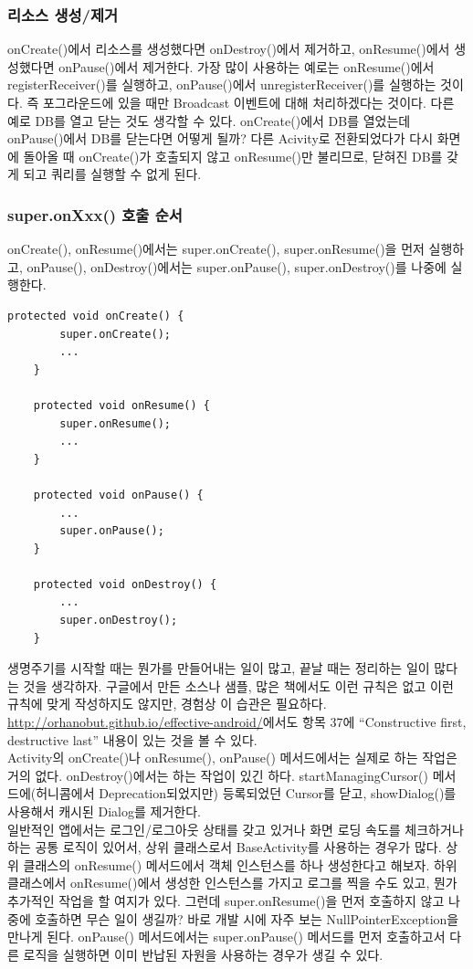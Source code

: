 \subsubsection{리소스 생성/제거}
onCreate()에서 리소스를 생성했다면 onDestroy()에서 제거하고, onResume()에서 생성했다면 onPause()에서 제거한다.
가장 많이 사용하는 예로는 onResume()에서 registerReceiver()를 실행하고, onPause()에서 unregisterReceiver()를 실행하는 것이다. 즉 포그라운드에 있을 때만 Broadcast 이벤트에 대해 처리하겠다는 것이다. 다른 예로 DB를 열고 닫는 것도 생각할 수 있다.
onCreate()에서 DB를 열었는데 onPause()에서 DB를 닫는다면 어떻게 될까?
다른 Acivity로 전환되었다가 다시 화면에 돌아올 때 onCreate()가 호출되지 않고 onResume()만 불리므로, 닫혀진 DB를 갖게 되고 쿼리를 실행할 수 없게 된다.

\subsubsection{super.onXxx() 호출 순서}
onCreate(), onResume()에서는 super.onCreate(), super.onResume()을 먼저 실행하고, 
onPause(), onDestroy()에서는 super.onPause(), super.onDestroy()를 나중에 실행한다.\\

\begin{lstlisting}[frame=single]
	protected void onCreate() {
    	super.onCreate();
    	...
	}

	protected void onResume() {
    	super.onResume();
    	...
	}

	protected void onPause() {
		...
		super.onPause();
	}

	protected void onDestroy() {
    	...
		super.onDestroy();
	}
\end{lstlisting}
생명주기를 시작할 때는 뭔가를 만들어내는 일이 많고, 끝날 때는 정리하는 일이 많다는 것을 생각하자.
구글에서 만든 소스나 샘플, 많은 책에서도 이런 규칙은 없고 이런 규칙에 맞게 작성하지도 않지만, 경험상 이 습관은 필요하다. \url{http://orhanobut.github.io/effective-android/}에서도 항목 37에 ``Constructive first, destructive last'' 내용이 있는 것을 볼 수 있다.\\

Activity의 onCreate()나 onResume(), onPause() 메서드에서는 실제로 하는 작업은 거의 없다.
onDestroy()에서는 하는 작업이 있긴 하다. 
startManagingCursor() 메서드에(허니콤에서 Deprecation되었지만) 등록되었던 Cursor를 닫고,
showDialog()를 사용해서 캐시된 Dialog를 제거한다.\\

일반적인 앱에서는 로그인/로그아웃 상태를 갖고 있거나 화면 로딩 속도를 체크하거나 하는 공통 로직이 있어서, 상위 클래스로서 BaseActivity를 사용하는 경우가 많다.
상위 클래스의 onResume() 메서드에서 객체 인스턴스를 하나 생성한다고 해보자. 
하위 클래스에서 onResume()에서 생성한 인스턴스를 가지고 로그를 찍을 수도 있고, 뭔가 추가적인 작업을 할 여지가 있다. 
그런데 super.onResume()을 먼저 호출하지 않고 나중에 호출하면 무슨 일이 생길까? 바로 개발 시에 자주 보는 NullPointerException을 만나게 된다.
onPause() 메서드에서는 super.onPause() 메서드를 먼저 호출하고서 다른 로직을 실행하면
이미 반납된 자원을 사용하는 경우가 생길 수 있다.\\

